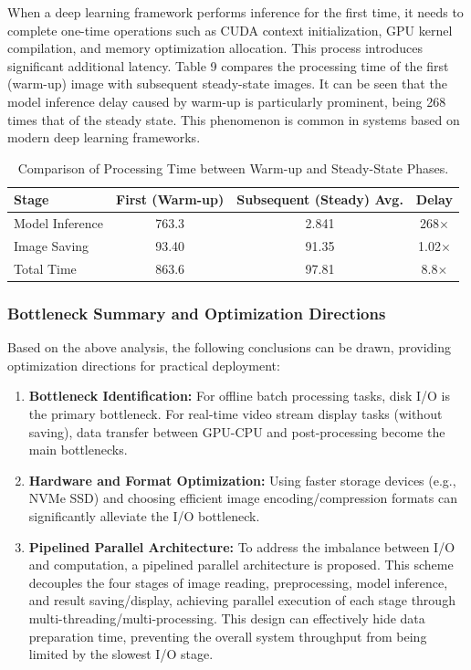\documentclass[sensors,article,submit,moreauthors]{Definitions/mdpi}
\begin{document}
When a deep learning framework performs inference for the first time, it needs to complete one-time operations such as CUDA context initialization, GPU kernel compilation, and memory optimization allocation. This process introduces significant additional latency. Table 9 compares the processing time of the first (warm-up) image with subsequent steady-state images. It can be seen that the model inference delay caused by warm-up is particularly prominent, being 268 times that of the steady state. This phenomenon is common in systems based on modern deep learning frameworks.

\begin{table}[H]
\caption{Comparison of Processing Time between Warm-up and Steady-State Phases.\label{tab9}}
\begin{tabularx}{\textwidth}{LCCC}
\toprule
\textbf{Stage}	& \textbf{First (Warm-up)}	& \textbf{Subsequent (Steady) Avg.}	& \textbf{Delay}\\
\midrule
Model Inference	& 763.3	& 2.841	& 268$\times$\\
Image Saving	& 93.40	& 91.35	& 1.02$\times$\\
Total Time	& 863.6	& 97.81	& 8.8$\times$\\
\bottomrule
\end{tabularx}
\end{table}

\subsubsection{Bottleneck Summary and Optimization Directions}

Based on the above analysis, the following conclusions can be drawn, providing optimization directions for practical deployment:

\begin{enumerate}
\item \textbf{Bottleneck Identification:} For offline batch processing tasks, disk I/O is the primary bottleneck. For real-time video stream display tasks (without saving), data transfer between GPU-CPU and post-processing become the main bottlenecks.
\item \textbf{Hardware and Format Optimization:} Using faster storage devices (e.g., NVMe SSD) and choosing efficient image encoding/compression formats can significantly alleviate the I/O bottleneck.
\item \textbf{Pipelined Parallel Architecture:} To address the imbalance between I/O and computation, a pipelined parallel architecture is proposed. This scheme decouples the four stages of image reading, preprocessing, model inference, and result saving/display, achieving parallel execution of each stage through multi-threading/multi-processing. This design can effectively hide data preparation time, preventing the overall system throughput from being limited by the slowest I/O stage.
\end{enumerate}
\end{document}
